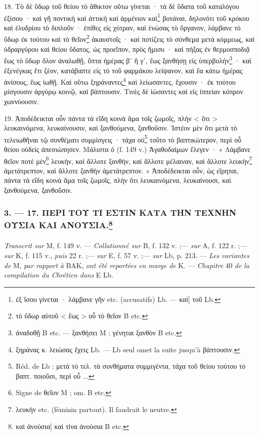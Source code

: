 \documentclass[a4paper, 11pt, oneside, polutonikogreek, french]{article}
\begin{document}
18. Τὸ δὲ ὕδωρ τοῦ θείου τὸ ἄθικτον οὕτω γίνεται · τὰ δὲ ὕδατα τοῦ καταλόγου ἐξίσου · καὶ γῆ ποντικὴ καὶ ἀττικὴ καὶ ἀρμένιον καὶ\footnote{ἐξ ἴσου γίνεται · λάμβανε γῆν etc. (accusatifs) Lb. --- καὶ] τοῦ Lb.} βοτάναι, δηλονότι τοῦ κρόκου καὶ ἐλυδρίου τὸ διπλοῦν · ἐπίθες εἰς χύτραν, καὶ ἑνώσας τὸ ὄργανον, λάμβανε τὸ ὕδωρ ἐκ τούτου καὶ τὸ θεῖον\footnote{τὸ ὕδωρ αὐτοῦ < ἕως > οὗ τὸ θεῖον B etc.} ἀκαυστοῖς · καὶ ποτίζεις τὸ σύνθεμα μετὰ κόμμεως, καὶ ὑδραργύρου καὶ θείου ὕδατος, ὡς προεῖπον, πρὸς ἥμισυ · καὶ πήξας ἐν θερμοσποδιᾷ ἕως τὸ ὕδωρ ὅλον ἀναλωθῇ, ὄπτα ἡμέρας βʹ ἢ γʹ, ἕως ξανθήσῃ εἰς ὑπερβολήν\footnote{ἀναδοθῇ B etc. --- ξανθήσει M ; γένηται ξανθὸν B etc.} · καὶ ἐξενέγκας ἔτι ζέον, κατάβαπτε εἰς τὸ τοῦ φαρμάκου λείψανον, καὶ ἔα κάτω ἡμέρας ἀνίσους, ἕως ἰωθῇ. Καὶ οὕτω ξηράναντες\footnote{ξηράνας κ. λειώσας ἔχεις Lb. --- Lb seul omet la suite jusqu'à βάπτουσιν.} καὶ λείωσαντες, ἔχουσιν · ἐκ τούτου μίσγουσιν ἀργύρῳ κοινῷ, καὶ βάπτουσιν. Τινὲς δὲ ἰώσαντες καὶ εἰς ἱππείαν κόπρον χωννύουσιν.

19. Ἀποδέδεικται οὖν πάντα τὰ εἴδη κοινὰ ἅμα τοῖς ζωμοῖς, πλὴν < ὅτι > λευκαινόμενα, λευκαίνουσιν, καὶ ξανθούμενα, ξανθοῦσιν. Ἰστέον μὲν ὅτι μετὰ τὸ τελειωθῆναι τῷ συνθέματι συμμίσγεις · τάχα οὐ\footnote{Réd. de Lb : μετὰ τὸ τελ. τὰ συνθήματα συμμιγέντα, τάχα τοῦ θείου τούτου τὸ βαπτ. ποιοῦσι, περὶ οὗ ...} τοῦτο τὸ βαπτικώτερον, περὶ οὗ θείου οὐδεὶς ἀπεσιώπησεν. Μάλιστα ὁ (f. 149 v.) Ἀγαθοδαίμων ἔλεγεν · « Λάμβανε θεῖον ποτὲ μὲν\footnote{Signe de θεῖον M ; om. B etc.} λευκὴν, καὶ ἄλλοτε ξανθὴν, καὶ ἄλλοτε μέλαιναν, καὶ ἄλλοτε λευκὴν\footnote{λευκὴν etc. (féminin partout). Il faudrait le neutre.} ἀμετάτρεπτον, καὶ ἄλλοτε ξανθὴν ἀμετάτρεπτον. » Ἀποδέδεικται οὖν, ὡς εἴρηται, πάντα τὰ εἴδη κοινὰ ἅμα τοῖς ζωμοῖς, πλὴν ὅτι λευκαινόμενα, λευκαίνουσι, καὶ ξανθούμενα, ξανθοῦσιν.

\bigskip
\centerline{\EightStarTaper}
\centerline{\EightStarTaper\EightStarTaper}
\bigskip

\subsubsection[3. --- 17. ΠΕΡΙ ΤΟΥ ΤΙ ΕΣΤΙΝ ΚΑΤΑ ΤΗΝ ΤΕΧΝΗΝ ΟΥΣΙΑ ΚΑΙ ΑΝΟΥΣΙΑ.]{3. --- 17. ΠΕΡΙ ΤΟΥ ΤΙ ΕΣΤΙΝ ΚΑΤΑ ΤΗΝ ΤΕΧΝΗΝ ΟΥΣΙΑ ΚΑΙ ΑΝΟΥΣΙΑ.\footnote{καὶ ἀνούσια] καὶ τίνα ἀνούσια B etc.}}
\paragraph{}
\emph{Transcrit sur} M, f. 149 v. --- \emph{Collationné sur} B, f. 132 v. ;--- \emph{sur} A, f. 122 r. ;--- \emph{sur} K, f. 115 v., \emph{puis} 22 r. ;--- \emph{sur} E, f. 57 v. ;--- \emph{sur} Lb, p. 213. --- \emph{Les variantes de} M, \emph{par rapport à} BAK, \emph{ont été reportées en marge de} K. --- \emph{Chapitre} 40 \emph{de la compilation du Chrétien dans} E Lb.
\end{document}
